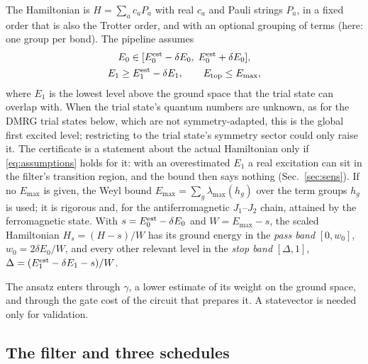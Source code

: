 \documentclass[aps,pra,twocolumn,superscriptaddress,nofootinbib]{revtex4-2}
\begin{document}
The Hamiltonian is $H=\sum_a c_aP_a$ with real $c_a$ and Pauli strings $P_a$, in a fixed order that is
also the Trotter order, and with an optional grouping of terms (here: one group per bond). The pipeline
assumes
\begin{equation}
\begin{gathered}
E_0\in[E_0^{\rm est}-\delta E_0,\;E_0^{\rm est}+\delta E_0],\\
E_1\ge E_1^{\rm est}-\delta E_1,\qquad E_{\rm top}\le E_{\max},
\end{gathered}
\label{eq:assumptions}
\end{equation}
where $E_1$ is the lowest level above the ground space that the trial state can overlap with. When the
trial state's quantum numbers are unknown, as for the DMRG trial states below, which are not
symmetry-adapted, this is the global first excited level; restricting to the trial state's symmetry
sector could only raise it. The certificate is a statement about the actual Hamiltonian only if
\eqref{eq:assumptions} holds for it: with an overestimated $E_1$ a real excitation can sit in the
filter's transition region, and the bound then says nothing (Sec.~\ref{sec:sens}). If no
$E_{\max}$ is given, the Weyl bound $E_{\max}=\sum_g\lambda_{\max}(h_g)$ over the term groups $h_g$ is
used; it is rigorous and, for the antiferromagnetic $J_1$--$J_2$ chain, attained by the ferromagnetic
state. With $s=E_0^{\rm est}-\delta E_0$ and $W=E_{\max}-s$, the scaled Hamiltonian $H_s=(H-s)/W$ has its
ground energy in the \emph{pass band} $[0,w_0]$, $w_0=2\delta E_0/W$, and every other relevant level in
the \emph{stop band} $[\Delta,1]$, $\Delta=(E_1^{\rm est}-\delta E_1-s)/W$.

The ansatz enters through $\gamma$, a lower estimate of its weight on the ground space, and through the
gate cost of the circuit that prepares it. A statevector is needed only for validation.

\subsection{The filter and three schedules}
\end{document}
